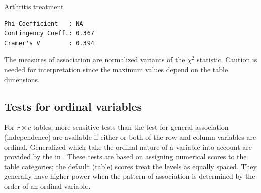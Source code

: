 \documentclass[10pt,krantz2]{krantz}\usepackage[]{graphicx}\usepackage[]{color}
\makeatletter
\newenvironment{kframe}{%
 \def\at@end@of@kframe{}%
 \ifinner\ifhmode%
  \def\at@end@of@kframe{\end{minipage}}%
  \begin{minipage}{\columnwidth}%
 \fi\fi%
 \def\FrameCommand##1{\hskip\@totalleftmargin \hskip-\fboxsep
 \colorbox{shadecolor}{##1}\hskip-\fboxsep
     \hskip-\linewidth \hskip-\@totalleftmargin \hskip\columnwidth}%
 \MakeFramed {\advance\hsize-\width
   \@totalleftmargin\z@ \linewidth\hsize
   \@setminipage}}%
 {\par\unskip\endMakeFramed%
 \at@end@of@kframe}
\newenvironment{knitrout}{}{} %
\renewenvironment{knitrout}{\small\renewcommand{\baselinestretch}{.85}}{} %
\makeatother
\begin{document}
\begin{Example}[arthrit2]{Arthritis treatment}
\begin{knitrout}
\begin{kframe}
\begin{verbatim}
Phi-Coefficient   : NA 
Contingency Coeff.: 0.367 
Cramer's V        : 0.394 
\end{verbatim}
\end{kframe}
\end{knitrout}
\end{Example}
\noindent The measures of association are normalized variants of the
$\chi^2$ statistic.  Caution is needed for interpretation since the maximum
values depend on the table dimensions.

\subsection{Tests for ordinal variables}\label{sec:ordinaltests}
For \(r \times  c\) tables, more sensitive tests
than the test for general association (independence)
are available if
either or both of the row and column variables are
ordinal. Generalized 
\citep{Landis-etal:1978}
which take the ordinal nature of a variable into
account are provided by the  in .
These tests are based on assigning numerical scores to
the table categories;  the default (table) scores treat the levels as
equally spaced.  They generally have higher power when the pattern of
association is determined by the order of an ordinal variable.
\end{document}
